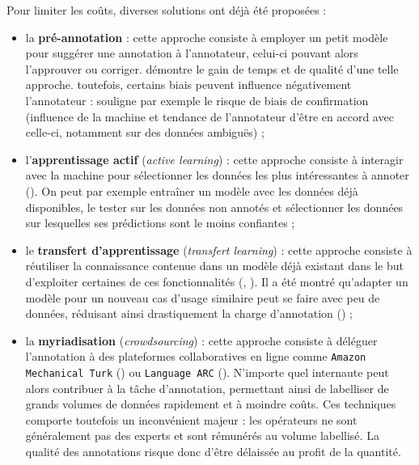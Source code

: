 			\begin{leftBarIdea}
				Pour limiter les coûts, diverses solutions ont déjà été proposées :
				\begin{itemize}
					\item la \textbf{pré-annotation} :
						cette approche consiste à employer un petit modèle pour suggérer une annotation à l'annotateur, celui-ci pouvant alors l'approuver ou corriger.
						\cite{fort-sagot:2010:influence-preannotation-postagged} démontre le gain de temps et de qualité d'une telle approche.
						toutefois, certains biais peuvent influence négativement l'annotateur : \cite{dandapat-etal:2009:complex-linguistic-annotation} souligne par exemple le risque de biais de confirmation (influence de la machine et tendance de l'annotateur d'être en accord avec celle-ci, notamment sur des données ambiguës) ;
					\item l'\textbf{apprentissage actif} (\textit{active learning}) :
						cette approche consiste à interagir avec la machine pour sélectionner les données les plus intéressantes à annoter (\cite{settles:2010:active-learning-literature}).
						On peut par exemple entraîner un modèle avec les données déjà disponibles, le tester sur les données non annotés et sélectionner les données sur lesquelles ses prédictions sont le moins confiantes ;
					\item le \textbf{transfert d'apprentissage} (\textit{transfert learning}) :
						cette approche consiste à réutiliser la connaissance contenue dans un modèle déjà existant dans le but d'exploiter certaines de ces fonctionnalités (\cite{zhuang-etal:2021:comprehensive-survey-transfer}, \cite{iman-etal:2023:review-deep-transfer}).
						Il a été montré qu'adapter un modèle pour un nouveau cas d'usage similaire peut se faire avec peu de données, réduisant ainsi drastiquement la charge d'annotation (\cite{parnami-lee:2022:learning-few-examples}) ;
					\item la \textbf{myriadisation} (\textit{crowdsourcing}) :
						cette approche consiste à déléguer l'annotation à des plateformes collaboratives en ligne comme \texttt{Amazon Mechanical Turk} (\cite{callison-burch-dredze:2010:creating-speech-language}) ou \texttt{Language ARC} (\cite{fiumara-etal:2020:languagearc-developing-language}).
						N'importe quel internaute peut alors contribuer à la tâche d'annotation, permettant ainsi de labelliser de grands volumes de données rapidement et à moindre coûts.
						Ces techniques comporte toutefois un inconvénient majeur : les opérateurs ne sont généralement pas des experts et sont rémunérés au volume labellisé.
						La qualité des annotations risque donc d'être délaissée au profit de la quantité.
				\end{itemize}
			\end{leftBarIdea}
		
